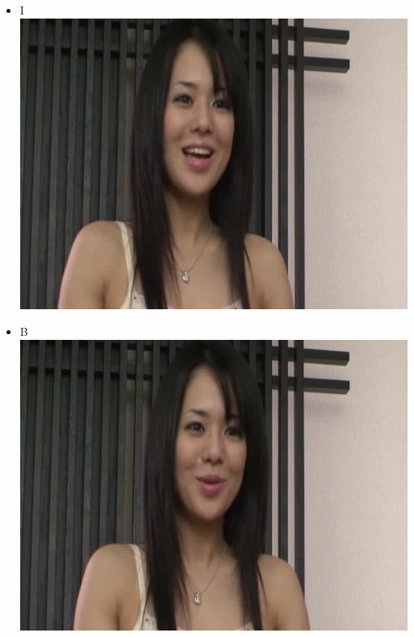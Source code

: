 \documentclass{beamer}
\begin{document}
\begin{frame}
\begin{itemize}
\item I\\
\includegraphics[scale=0.40]{fig/cjk1.jpg}
\end{itemize}
\end{frame}
\begin{frame}
\begin{itemize}
\item B\\
\includegraphics[scale=0.40]{fig/cjk2.jpg}
\end{itemize}
\end{frame}
\end{document}
